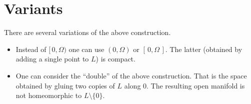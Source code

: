 \documentclass[12pt]{article}
\newcommand{\GW}{\Omega}
\begin{document}
\section*{Variants}
There are several variations of the above construction.

\begin{itemize}
\item Instead of $[\,0,\GW)$ one can use $(0,\GW)$ or $[\,0,\GW\,]$. The latter (obtained by adding a single point to $L$) is compact.

\item One can consider the ``double'' of the above construction. That is the
  space obtained by gluing two copies of $L$ along $0$. The resulting open
  manifold is not homeomorphic to $L\setminus \{0\}$.
\end{itemize}
\end{document}
